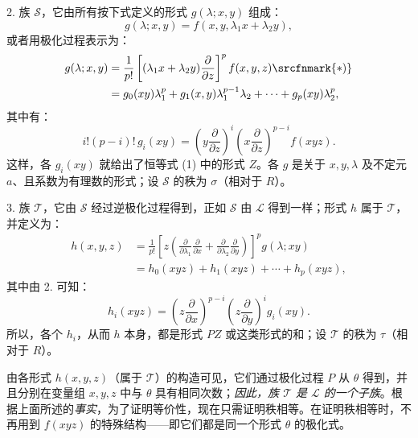 2. 族 $\mathcal S$，它由所有按下式定义的形式 $g(\lambda;x,y)$ 组成：
\[
  g(\lambda;x,y)=f(x,y,\lambda_1x+\lambda_2y),
\]
或者用极化过程表示为：
\[
\begin{aligned}
  g(\lambda;x,y)
  &=\frac1{p!}\left[(\lambda_1x+\lambda_2y)\frac{\partial}{\partial z}\right]^p f(x,y,z)\srcfnmark{*)} \\
  &=g_0(xy)\lambda_1^p+g_1(x,y)\lambda_1^{p-1}\lambda_2+\cdots+g_p(xy)\lambda_2^p,
\end{aligned}
\]
其中有：
\[
  i!(p-i)!\,g_i(xy)=
  \left(y\frac{\partial}{\partial z}\right)^i
  \left(x\frac{\partial}{\partial z}\right)^{p-i}f(xyz).
\]
这样，各 $g_i(xy)$ 就给出了恒等式 (1) 中的形式 $Z$。各 $g$ 是关于 $x,y,\lambda$ 及不定元 $a$、且系数为有理数的形式；设 $\mathcal S$ 的秩为 $\sigma$（相对于 $R$）。

3. 族 $\mathcal T$，它由 $\mathcal S$ 经过逆极化过程得到，正如 $\mathcal S$ 由 $\mathcal L$ 得到一样；形式 $h$ 属于 $\mathcal T$，并定义为：
\[
\begin{aligned}
 h(x,y,z)
 &=\frac1{p!}\left[z\left(\frac{\partial}{\partial\lambda_1}\frac{\partial}{\partial x}
 +\frac{\partial}{\partial\lambda_2}\frac{\partial}{\partial y}\right)\right]^p g(\lambda;xy)\\
 &=h_0(xyz)+h_1(xyz)+\cdots+h_p(xyz),
\end{aligned}
\]
其中由 2. 可知：
\[
  h_i(xyz)=
  \left(z\frac{\partial}{\partial x}\right)^{p-i}
  \left(z\frac{\partial}{\partial y}\right)^i g_i(xy).
\]
所以，各个 $h_i$，从而 $h$ 本身，都是形式 $PZ$ 或这类形式的和；设 $\mathcal T$ 的秩为 $\tau$（相对于 $R$）。

由各形式 $h(x,y,z)$（属于 $\mathcal T$）的构造可见，它们通过极化过程 $P$ 从 $\theta$ 得到，并且分别在变量组 $x,y,z$ 中与 $\theta$ 具有相同次数；\emph{因此，族 $\mathcal T$ 是 $\mathcal L$ 的一个子族}。根据上面所述的\emph{事实}，为了证明等价性，现在只需证明秩相等。在证明秩相等时，不再用到 $f(xyz)$ 的特殊结构——即它们都是同一个形式 $\theta$ 的极化式。

